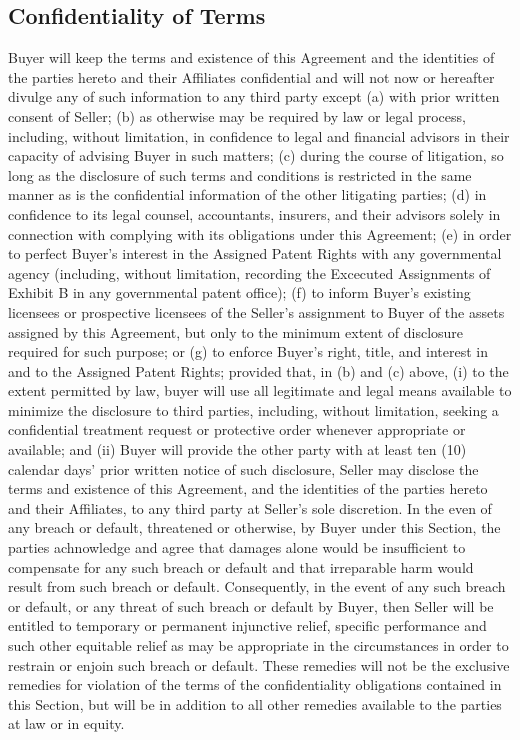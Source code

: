 \documentclass[letterpaper,10pt,openany,oneside,english]{sphinxmanual}
\begin{document}
\subsection{Confidentiality of Terms}
\label{\detokenize{7-miscellaneous:confidentiality-of-terms}}
Buyer will keep the terms and existence of this Agreement and the identities of the parties hereto and their Affiliates confidential and will not now or hereafter divulge any of such information to any third party except (a) with prior written consent of Seller; (b) as otherwise may be required by law or legal process, including, without limitation, in confidence to legal and financial advisors in their capacity of advising Buyer in such matters; (c) during the course of litigation, so long as the disclosure of such terms and conditions is restricted in the same manner as is the confidential information of the other litigating parties; (d) in confidence to its legal counsel, accountants, insurers, and their advisors solely in connection with complying with its obligations under this Agreement; (e) in order to perfect Buyer’s interest in the Assigned Patent Rights with any governmental agency (including, without limitation, recording the Excecuted Assignments of Exhibit B in any governmental patent office); (f) to inform Buyer’s existing licensees or prospective licensees of the Seller’s assignment to Buyer of the assets assigned by this Agreement, but only to the minimum extent of disclosure required for such purpose; or (g) to enforce Buyer’s right, title, and interest in and to the Assigned Patent Rights; provided that, in (b) and (c) above,  (i) to the extent permitted by law, buyer will use all legitimate and legal means available to minimize the disclosure to third parties, including, without limitation, seeking a confidential treatment request or protective order whenever appropriate or available; and (ii) Buyer will provide the other party with at least ten (10) calendar days’ prior written notice of such disclosure, Seller may disclose the terms and existence of this Agreement, and the identities of the parties hereto and their Affiliates, to any third party at Seller’s sole discretion.  In the even of any breach or default, threatened or otherwise, by Buyer under this Section, the parties achnowledge and agree that damages alone would be insufficient to compensate for any such breach or default and that irreparable harm would result from such breach or default. Consequently, in the event of any such breach or default, or any threat of such breach or default by Buyer, then Seller will be entitled to temporary or permanent injunctive relief, specific performance and such other equitable relief as may be appropriate in the circumstances in order to restrain or enjoin such breach or default. These remedies will not be the exclusive remedies for violation of the terms of the confidentiality obligations contained in this Section, but will be in addition to all other remedies available to the parties at law or in equity.
\end{document}
